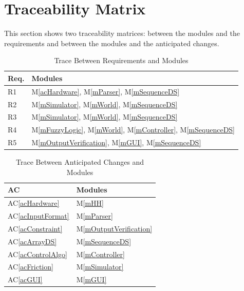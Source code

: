 \documentclass[12pt, titlepage]{article}
\newcommand{\acref}[1]{AC\ref{#1}}
\newcommand{\mref}[1]{M\ref{#1}}
\begin{document}

\section{Traceability Matrix} \label{SecTM}

This section shows two traceability matrices: between the modules and the
requirements and between the modules and the anticipated changes.

\begin{table}[H]
\centering
\begin{tabular}{p{} p{}}
\toprule
\textbf{Req.} & \textbf{Modules}\\
\midrule
R1 & \mref{acHardware}, \mref{mParser}, \mref{mSequenceDS}\\
R2 & \mref{mSimulator}, \mref{mWorld}, \mref{mSequenceDS}\\
R3 & \mref{mSimulator}, \mref{mWorld}, \mref{mSequenceDS}\\
R4 & \mref{mFuzzyLogic}, \mref{mWorld}, \mref{mController}, \mref{mSequenceDS}\\
R5 & \mref{mOutputVerification}, \mref{mGUI}, \mref{mSequenceDS}\\
\bottomrule
\end{tabular}
\caption{Trace Between Requirements and Modules}
\label{TblRT}
\end{table}

\begin{table}[H]
\centering
\begin{tabular}{p{} p{}}
\toprule
\textbf{AC} & \textbf{Modules}\\
\midrule
\acref{acHardware} & \mref{mHH}\\
\acref{acInputFormat} & \mref{mParser}\\
\acref{acConstraint} & \mref{mOutputVerification}\\
\acref{acArrayDS} & \mref{mSequenceDS}\\
\acref{acControlAlgo} & \mref{mController}\\
\acref{acFriction} & \mref{mSimulator}\\
\acref{acGUI} & \mref{mGUI}\\
\bottomrule
\end{tabular}
\caption{Trace Between Anticipated Changes and Modules}
\label{TblACT}
\end{table}
\end{document}
